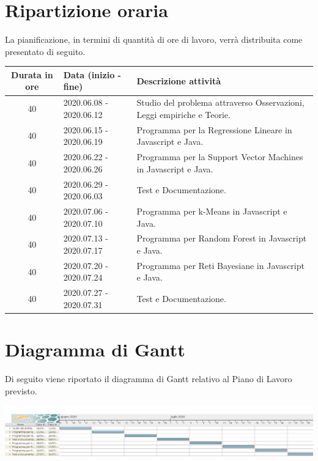 \section{Ripartizione oraria}
La pianificazione, in termini di quantità di ore di lavoro, verrà distribuita come presentato di seguito.
{\renewcommand{\arraystretch}{2}
\begin{longtable}{|c|p{4cm}|p{7cm}|}
	
		\hline \rowcolor{blue}
		\textbf{Durata in ore} &
		\textbf{Data (inizio - fine)} & 
		\textbf{Descrizione attività}  \\ \hline
		\endhead
		\hline \rowcolor{lightbrown}
		40 & 
		2020.06.08 - 2020.06.12 & 
		Studio del problema attraverso Osservazioni, Leggi empiriche e Teorie. \\	
	\hline \rowcolor{lighterbrown}
		40 & 
		2020.06.15 - 2020.06.19 & 
		Programma per la Regressione Lineare in Javascript e Java. \\	
		\hline \rowcolor{lightbrown}
		40 & 
		2020.06.22 - 2020.06.26 & 
		Programma per la Support Vector Machines in Javascript e Java. \\	
	\hline \rowcolor{lighterbrown}
		40 & 
		2020.06.29 - 2020.06.03 & 
		Test e Documentazione. \\
		\hline \rowcolor{lightbrown}
		40 & 
		2020.07.06 - 2020.07.10 & 
		Programma per k-Means in Javascript e Java. \\	
	\hline \rowcolor{lighterbrown}
		40 & 
		2020.07.13 - 2020.07.17 & 
		Programma per Random Forest in Javascript e Java. \\
	\hline \rowcolor{lightbrown}
		40 & 
		2020.07.20 - 2020.07.24 & 
		 Programma per Reti Bayesiane in Javascript e Java. \\
	\hline \rowcolor{lighterbrown}
		40 & 
		2020.07.27 - 2020.07.31 & 
		Test e Documentazione. \\
		\hline
\end{longtable}}	

\section{Diagramma di Gantt}
Di seguito viene riportato il diagramma di Gantt relativo al Piano di Lavoro previsto.
\begin{center}
    \includegraphics[scale=0.3]{./img/GanttVale.png}
     \label{fig:ganttvale}
	 \end{center}
		